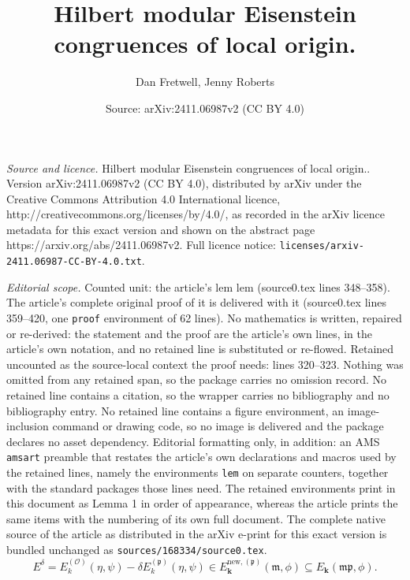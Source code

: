 \documentclass[10pt,a4paper]{amsart}
\title{Hilbert modular Eisenstein congruences of local origin.}
\author{Dan Fretwell, Jenny Roberts}
\date{Source: arXiv:2411.06987v2 (CC BY 4.0)}
\begin{document}
\maketitle

\noindent\emph{Source and licence.} Hilbert modular Eisenstein congruences of local origin.. Version arXiv:2411.06987v2 (CC BY 4.0), distributed by arXiv under the Creative Commons Attribution 4.0 International licence, http://creativecommons.org/licenses/by/4.0/, as recorded in the arXiv licence metadata for this exact version and shown on the abstract page https://arxiv.org/abs/2411.06987v2. Full licence notice: \texttt{licenses/arxiv-2411.06987-CC-BY-4.0.txt}.\par\smallskip

\noindent\textit{Editorial scope.} Counted unit: the article's lem lem (source0.tex lines 348--358). The article's complete original proof of it is delivered with it (source0.tex lines 359--420, one \texttt{proof} environment of 62 lines). No mathematics is written, repaired or re-derived: the statement and the proof are the article's own lines, in the article's own notation, and no retained line is substituted or re-flowed.  Retained uncounted as the source-local context the proof needs: lines 320--323.  Nothing was omitted from any retained span, so the package carries no omission record.  No retained line contains a citation, so the wrapper carries no bibliography and no bibliography entry.  No retained line contains a figure environment, an image-inclusion command or drawing code, so no image is delivered and the package declares no asset dependency.  Editorial formatting only, in addition: an AMS \texttt{amsart} preamble that restates the article's own declarations and macros used by the retained lines, namely the environments \texttt{lem} on separate counters, together with the standard packages those lines need.  The retained environments print in this document as Lemma 1 in order of appearance, whereas the article prints the same items with the numbering of its own full document.  The complete native source of the article as distributed in the arXiv e-print for this exact version is bundled unchanged as \texttt{sources/168334/source0.tex}.
\begin{equation}
\label{eq:Edelta}
    E^\delta = E_k^{(\mathcal{O})}(\eta, \psi) - \delta E_k^{(\mathfrak{p})}(\eta, \psi) \in E_{\textbf{k}}^{\text{new},(\mathfrak{p})}(\mathfrak{m},\phi)\subseteq E_{\textbf{k}}(\mathfrak{mp},\phi).
\end{equation}
\end{document}
